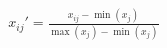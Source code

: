 \begin{align}\label{eq:minmax}
    x_{ij}' = \frac{x_{ij} - \min(x_j)}{\max(x_j)-\min(x_j)} 
\end{align}
